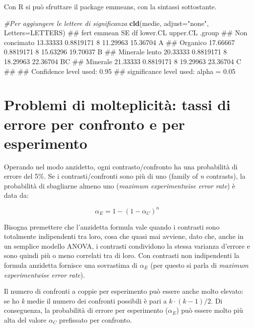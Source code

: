 \documentclass[a4paper,12pt,oneside]{book}
\newenvironment{Shaded}{\begin{snugshade}}{\end{snugshade}}
\newcommand{\KeywordTok}[1]{\textcolor[rgb]{0.13,0.29,0.53}{\textbf{#1}}}
\newcommand{\DataTypeTok}[1]{\textcolor[rgb]{0.13,0.29,0.53}{#1}}
\newcommand{\StringTok}[1]{\textcolor[rgb]{0.31,0.60,0.02}{#1}}
\newcommand{\CommentTok}[1]{\textcolor[rgb]{0.56,0.35,0.01}{\textit{#1}}}
\newcommand{\NormalTok}[1]{#1}
\theoremstyle{definition}
\theoremstyle{definition}
\theoremstyle{definition}
\theoremstyle{remark}
\begin{document}
Con R si può sfruttare il package emmeans, con la sintassi sottostante.

\begin{Shaded}
\begin{Highlighting}[]
\CommentTok{#Per aggiungere le lettere di significanza}
\KeywordTok{cld}\NormalTok{(medie, }\DataTypeTok{adjust=}\StringTok{"none"}\NormalTok{, }\DataTypeTok{Letters=}\NormalTok{LETTERS)}
\NormalTok{##  fert             emmean        SE df lower.CL upper.CL .group}
\NormalTok{##  Non concimato  13.33333 0.8819171  8 11.29963 15.36704  A    }
\NormalTok{##  Organico       17.66667 0.8819171  8 15.63296 19.70037   B   }
\NormalTok{##  Minerale lento 20.33333 0.8819171  8 18.29963 22.36704   BC  }
\NormalTok{##  Minerale       21.33333 0.8819171  8 19.29963 23.36704    C  }
\NormalTok{## }
\NormalTok{## Confidence level used: 0.95 }
\NormalTok{## significance level used: alpha = 0.05}
\end{Highlighting}
\end{Shaded}

\section{Problemi di molteplicità: tassi di errore per confronto e per
esperimento}\label{problemi-di-molteplicita-tassi-di-errore-per-confronto-e-per-esperimento}

Operando nel modo anzidetto, ogni contrasto/confronto ha una probabilità
di errore del 5\%. Se i contrasti/confronti sono più di uno (family of
\emph{n} contrasts), la probabilità di sbagliarne almeno uno
(\emph{maximum experimentwise error rate}) è data da:

\[\alpha_E = 1 - (1 - \alpha_C)^n\]

Bisogna premettere che l'anzidetta formula vale quando i contrasti sono
totalmente indipendenti tra loro, cosa che quasi mai avviene, dato che,
anche in un semplice modello ANOVA, i contrasti condividono la stessa
varianza d'errore e sono quindi più o meno correlati tra di loro. Con
contrasti non indipendenti la formula anzidetta fornisce una sovrastima
di \(\alpha_E\) (per questo si parla di \emph{maximum experimentwise
error rate}).

Il numero di confronti a coppie per esperimento può essere anche molto
elevato: se ho \emph{k} medie il numero dei confronti possibili è pari a
\(k \cdot (k-1)/2\). Di conseguenza, la probabilità di errore per
esperimento (\(\alpha_E\)) può essere molto più alta del valore
\(\alpha_C\) prefissato per confronto.
\end{document}
